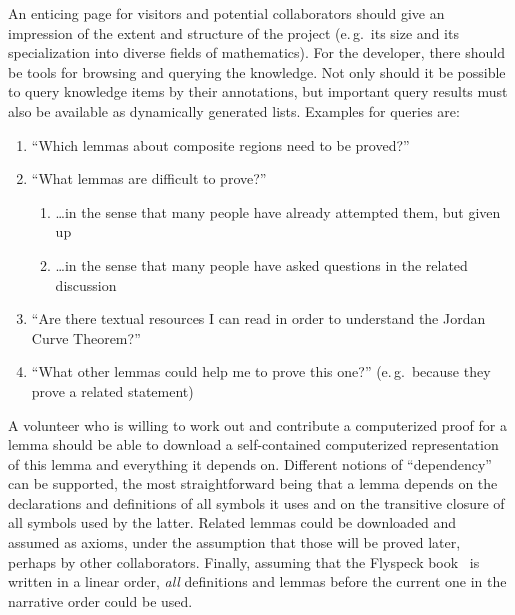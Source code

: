 \begin{contribution}
An enticing page for visitors and potential collaborators should give an
impression of the extent and structure of the project (e.\,g.\ its size and its
specialization into diverse fields of mathematics).  For the developer, there
should be tools for browsing and querying the knowledge.  Not only should it be
possible to query knowledge items by their annotations, but important query
results must also be available as dynamically generated lists.  Examples for
queries are:

\begin{enumerate}
\item\label{item:proven-lemma} ``Which lemmas about composite regions need
  to be proved?''
\item ``What lemmas are difficult to prove?''
  \begin{enumerate}
  \item \ldots in the sense that many people have already attempted them, but given up
  \item\label{item:question-count} \ldots in the sense that many people have asked
    questions in the related discussion
  \end{enumerate}
\item ``Are there textual resources I can read in order to understand the Jordan
  Curve Theorem?''
\item ``What other lemmas could help me to prove this one?'' (e.\,g.\ because
  they prove a related statement)
\end{enumerate}

A volunteer who is willing to work out and contribute a computerized proof for a
lemma should be able to download a self-contained computerized representation of
this lemma and everything it depends on.  Different notions of ``dependency''
can be supported, the most straightforward being that a lemma depends on the
declarations and definitions of all symbols it uses and on the transitive
closure of all symbols used by the latter.  Related lemmas could be downloaded
and assumed as axioms, under the assumption that those will be proved later,
perhaps by other collaborators.  Finally, assuming that the Flyspeck
book~\cite{Hales:2008:FlyspeckBook} is written in a linear order, \emph{all}
definitions and lemmas before the current one in the narrative order could be
used.  


\end{contribution}
